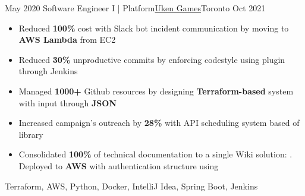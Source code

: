 %
%
%
\begin{experiences}
  \experience
    {May 2020}   {Software Engineer I | Platform}{\href{https://uken.com}{Uken Games}}{Toronto}
    {Oct 2021} {
                    \begin{itemize}
                        \setlength\itemsep{0.2em}
                        \item Reduced \textbf{100\%} cost with Slack bot incident communication by moving to \textbf{AWS Lambda} from EC2
                        
                        \item Reduced \textbf{30\%} unproductive commits by enforcing codestyle using  plugin through Jenkins
                        
                        \item Managed \textbf{1000+} Github resources by designing \textbf{Terraform-based} system with input through \textbf{JSON}

                        \item Increased campaign's outreach by \textbf{28\%} with API scheduling system based of  library
                        
                        \item Consolidated \textbf{100\%} of technical documentation to a single Wiki solution: . Deployed to \textbf{AWS} with authentication structure using 
                    \end{itemize}
                    }
                    {Terraform, AWS, Python, Docker, IntelliJ Idea, Spring Boot, Jenkins}
\end{experiences}
